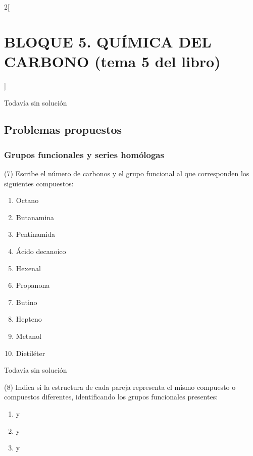 \documentclass[10pt]{article}
\begin{document}
\begin{multicols}{2}[
  \section{BLOQUE 5. QUÍMICA DEL CARBONO (tema 5 del libro)}
  ]
\begin{solution}[print=false]
  Todavía sin solución
\end{solution}






\subsection{Problemas propuestos}

\subsubsection{Grupos funcionales y series homólogas}

\begin{exercise}[
    tags    = {},
    topics  = {química, química orgánica, orgánica},
    source  = {FQ 1B MGH 2016, p150, e7},
  ]
  (7) Escribe el número de carbonos y el grupo funcional al que
  corresponden los siguientes compuestos:
  \begin{enumerate}
    \item Octano
    \item Butanamina
    \item Pentinamida
    \item Ácido decanoico
    \item Hexenal
    \item Propanona
    \item Butino
    \item Hepteno
    \item Metanol
    \item Dietiléter
  \end{enumerate}
\end{exercise}

\begin{solution}[print=false]
  Todavía sin solución
\end{solution}




\begin{exercise}[
    tags    = {},
    topics  = {química, química orgánica, orgánica},
    source  = {FQ 1B MGH 2016, p150, e8},
  ]
  (8) Indica si la estructura de cada pareja representa el mismo
  compuesto o compuestos diferentes, identificando los grupos
  funcionales presentes:
  \begin{enumerate}
    \item {} y 
    \item {} y 
    \item {} y 
  \end{enumerate}
\end{exercise}


\end{multicols}
\end{document}

